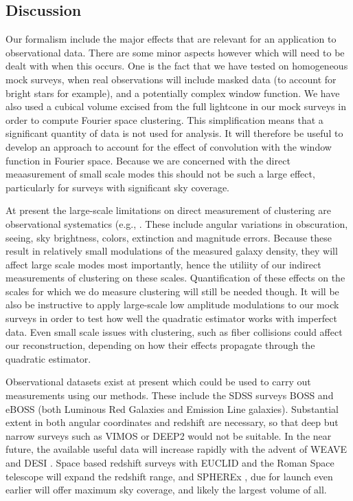 \documentclass[prd,amsmath,amssymb,floatfix,superscriptaddress,nofootinbib,twocolumn]{revtex4-1}
\begin{document}
\subsection{Discussion}

Our formalism include the major effects that are relevant for an application
to observational data. There are some minor aspects however which will need to
be dealt with when this occurs. One is the fact that we have tested on
homogeneous mock surveys, when real observations will include masked data (to
account for bright stars for example), and a potentially complex window
function. We have also used a cubical volume excised from the full
lightcone in our mock surveys in order to compute Fourier space clustering.
This simplification means that a significant quantity of
data is not used for analysis. It will therefore be useful to develop
an approach to account for the effect of convolution with
the window function in Fourier space. Because we are concerned with the
direct meaasurement of small scale modes this should not
be such a large effect,
particularly for surveys with significant sky coverage.

At present the large-scale limitations on direct measurement of clustering
are observational systematics (e.g.,
\cite{https://ui.adsabs.harvard.edu/abs/2012ApJ...761...14H/abstract}.
These include angular variations in obscuration, seeing, sky brightness,
colors, extinction and magnitude errors. Because these result
in relatively small modulations of the measured galaxy density, they
will affect large scale modes most importantly, hence the utiliity of
our
indirect measurements of clustering on these scales. Quantification
of these effects on the scales for which we do measure clustering will
still be needed though. It will be also be instructive to apply large-scale
low amplitude modulations to our mock surveys in order to test how
well the quadratic estimator works with imperfect data. Even small
scale issues with clustering, such as fiber collisions \cite{} could
affect our reconstruction, depending on how their effects propagate through
the quadratic estimator.


Observational datasets exist at present which could be used to carry out
measurements using our methods. These include the SDSS surveys BOSS and eBOSS
\cite{SDSSBOSS,eBOSS}
(both Luminous Red Galaxies and Emission Line galaxies). Substantial
extent in both angular coordinates and redshift are necessary, so
that deep but narrow surveys such as VIMOS or DEEP2 would not be suitable.
In the near future, the available useful data will increase rapidly
with the advent of WEAVE \cite{weave} and DESI \cite{DESI}.
Space based redshift
surveys  with EUCLID and the  Roman Space telescope \cite{Euclid,Roman}
will expand the redshift range, and SPHEREx \cite{spherex},
due for launch even earlier will offer maximum sky coverage, and likely the
largest volume of all.
\end{document}
